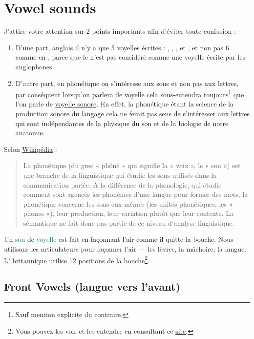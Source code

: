 \part{Vowel sounds}\label{chap:vow}


J'attire votre attention sur 2 points importants afin d'éviter toute
confusion :
\begin{enumerate}
\item D'une part, anglais il n'y a que 5 voyelles écrites : , ,
  ,  et , et non pas 6 comme en ,
  parce que le  n'est pas  considéré comme une voyelle écrite
  par les anglophones.
\item D'autre part, en phonétique on s'intéresse aux sons et non pas aux
  lettres, par conséquent lorsqu'on parlera de voyelle cela
  sous-entendra toujours\footnote{Sauf mention explicite du
    contraire.} que l'on parle de \underline{voyelle sonore}. En
  effet, la phonétique étant la science de la production sonore du
  langage cela ne ferait pas sens de s'intéresser aux lettres qui sont
  indépendantes de la physique du son et de la biologie de notre anatomie.
\end{enumerate}
Selon \href{https://fr.wikipedia.org/wiki/Phon\%C3\%A9tique}{Wikipédia} :
\begin{quote}
  La phonétique (du grec « phônê » qui signifie la « voix », le « son ») est une branche de la linguistique qui étudie les sons utilisés dans la communication parlée. À la différence de la phonologie, qui étudie comment sont agencés les phonèmes d'une langue pour former des mots, la phonétique concerne les sons eux-mêmes (les unités phonétiques, les « phones »), leur production, leur variation plutôt que leur contexte. La sémantique ne fait donc pas partie de ce niveau d'analyse linguistique.
\end{quote}

Un \textcolor{teal}{son} de \textcolor{teal}{voyelle}
est fait en façonnant l'air comme il quitte la
bouche. Nous utilisons les articulateurs pour façonner l'air --- les
lèvres, la mâchoire, la langue. L' britannique utilise
12 positions de la bouche\footnote{Vous pouvez les voir et les
  entendre en consultant ce \href{https://pronunciationstudio.com/vowel02/}{site}.}.  


\chapter{Front Vowels (langue vers l'avant)}\label{chap:frontvow}

